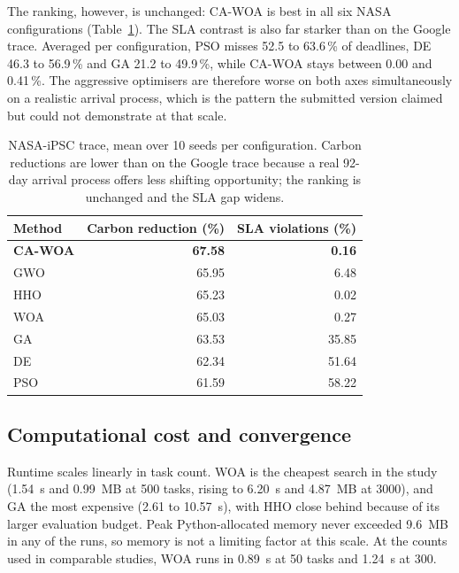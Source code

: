 \documentclass[12pt,a4paper]{article}
\begin{document}
The ranking, however, is unchanged: CA-WOA is best in all six NASA configurations
(Table~\ref{tab:nasa}). The SLA contrast is also far starker than on the Google
trace. Averaged per configuration, PSO misses 52.5 to 63.6\,\% of deadlines, DE 46.3
to 56.9\,\% and GA 21.2 to 49.9\,\%, while CA-WOA stays between 0.00 and 0.41\,\%.
The aggressive optimisers are therefore worse on both axes simultaneously on a
realistic arrival process, which is the pattern the submitted version claimed but
could not demonstrate at that scale.

\begin{table}[H]\centering\small
\caption{NASA-iPSC trace, mean over 10 seeds per configuration. Carbon reductions
are lower than on the Google trace because a real 92-day arrival process offers
less shifting opportunity; the ranking is unchanged and the SLA gap widens.}
\label{tab:nasa}
\begin{tabular}{lrr}
\toprule
Method & Carbon reduction (\%) & SLA violations (\%) \\
\midrule
\textbf{CA-WOA} & \textbf{67.58} & \textbf{0.16} \\
GWO             & 65.95 & 6.48 \\
HHO             & 65.23 & 0.02 \\
WOA             & 65.03 & 0.27 \\
GA              & 63.53 & 35.85 \\
DE              & 62.34 & 51.64 \\
PSO             & 61.59 & 58.22 \\
\bottomrule
\end{tabular}
\end{table}

\subsection{Computational cost and convergence}\label{sec:cost}
Runtime scales linearly in task count. WOA is the cheapest search in the study (1.54~s and 0.99~MB at 500
tasks, rising to 6.20~s and 4.87~MB at 3000), and GA the most expensive (2.61 to 10.57~s), with HHO close
behind because of its larger evaluation budget. Peak Python-allocated memory never exceeded 9.6~MB in any of
the runs, so memory is not a limiting factor at this scale. At the counts used in comparable studies, WOA runs in
0.89~s at 50 tasks and 1.24~s at 300.
\end{document}
